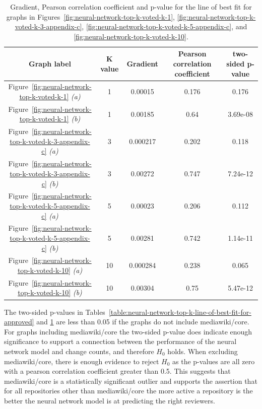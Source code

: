 \begin{table}[H]
    \centering
    \begin{tabular}{@{}c c c c c@{}} 
    \hline
    \textbf{Graph label} & \textbf{K value} & \textbf{Gradient} & \textbf{Pearson correlation coefficient} & \textbf{two-sided p-value} \\
    \hline
Figure~\ref{fig:neural-network-top-k-voted-k-1} \emph{(a)} & 1 & 0.00015 & 0.176 & 0.176 \\
Figure~\ref{fig:neural-network-top-k-voted-k-1} \emph{(b)} & 1 & 0.00185 & 0.64 & 3.69e-08 \\
Figure~\ref{fig:neural-network-top-k-voted-k-3-appendix-c} \emph{(a)} & 3 & 0.000217 & 0.202 & 0.118 \\
Figure~\ref{fig:neural-network-top-k-voted-k-3-appendix-c} \emph{(b)} & 3 & 0.00272 & 0.747 & 7.24e-12 \\
Figure~\ref{fig:neural-network-top-k-voted-k-5-appendix-c} \emph{(a)} & 5 & 0.00023 & 0.206 & 0.112 \\
Figure~\ref{fig:neural-network-top-k-voted-k-5-appendix-c} \emph{(b)} & 5 & 0.00281 & 0.742 & 1.14e-11 \\
Figure~\ref{fig:neural-network-top-k-voted-k-10} \emph{(a)} & 10 & 0.000284 & 0.238 & 0.065 \\
Figure~\ref{fig:neural-network-top-k-voted-k-10} \emph{(b)} & 10 & 0.00304 & 0.75 & 5.47e-12 \\
    \hline
    \end{tabular}
    \caption{Gradient, Pearson correlation coefficient and p-value for the line of best fit for graphs in Figures~\ref{fig:neural-network-top-k-voted-k-1}, \ref{fig:neural-network-top-k-voted-k-3-appendix-c}, \ref{fig:neural-network-top-k-voted-k-5-appendix-c}, and \ref{fig:neural-network-top-k-voted-k-10}.}
    \label{table:neural-network-top-k-line-of-best-fit-for-voted}
\end{table}

The two-sided p-values in Tables~\ref{table:neural-network-top-k-line-of-best-fit-for-approved} and \ref{table:neural-network-top-k-line-of-best-fit-for-voted} are less than 0.05 if the graphs do not include mediawiki/core. For graphs including mediawiki/core the two-sided p-value does indicate enough significance to support a connection between the performance of the neural network model and change counts, and therefore \(H_0\) holds. When excluding mediawiki/core, there is enough evidence to reject \(H_0\) as the p-values are all zero with a pearson correlation coefficient greater than 0.5. This suggests that mediawiki/core is a statistically significant outlier and supports the assertion that for all repositories other than mediawiki/core the more active a repository is the better the neural network model is at predicting the right reviewers.

